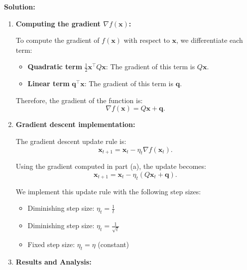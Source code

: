 \documentclass{article}
\begin{document}
\begin{enumerate}
    \textbf{Solution:}
    
    \begin{enumerate}
        \item \textbf{Computing the gradient $\nabla f(\mathbf{x})$:}
        
        To compute the gradient of $f(\mathbf{x})$ with respect to $\mathbf{x}$, we differentiate each term:
    
        \begin{itemize}
            \item \textbf{Quadratic term} $\frac{1}{2} \mathbf{x}^\top Q \mathbf{x}$:
               The gradient of this term is $Q\mathbf{x}$.
    
            \item \textbf{Linear term} $\mathbf{q}^\top \mathbf{x}$:
               The gradient of this term is $\mathbf{q}$.
        \end{itemize}
    
        Therefore, the gradient of the function is:
        \[
        \nabla f(\mathbf{x}) = Q \mathbf{x} + \mathbf{q}.
        \]
    
        \item \textbf{Gradient descent implementation:}
    
        The gradient descent update rule is:
        \[
        \mathbf{x}_{t+1} = \mathbf{x}_t - \eta_t \nabla f(\mathbf{x}_t).
        \]
    
        Using the gradient computed in part (a), the update becomes:
        \[
        \mathbf{x}_{t+1} = \mathbf{x}_t - \eta_t (Q \mathbf{x}_t + \mathbf{q}).
        \]
    
        We implement this update rule with the following step sizes:
        \begin{itemize}
            \item Diminishing step size: $\eta_t = \frac{1}{t}$
            \item Diminishing step size: $\eta_t = \frac{1}{\sqrt{t}}$
            \item Fixed step size: $\eta_t = \eta$ (constant)
        \end{itemize}
    
        \item \textbf{Results and Analysis:}
    

\end{enumerate}
\end{enumerate}
\end{document}
